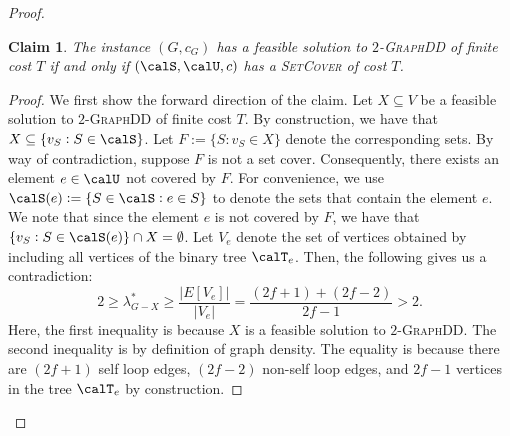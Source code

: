 \documentclass{article}
\newtheorem{claim}{Claim}[section]
\newcommand{\densitydeletionset}{\textsc{GraphDD}\xspace}
\newcommand{\setcover}{\textsc{SetCover}\xspace}
\begin{document}
\begin{proof}
    \begin{claim}\label{claim:reduction-correctness}
         The instance $(G, c_G)$ has a feasible solution to $2$-\densitydeletionset of finite cost $T$ if and only if $(\calS, \calU, c)$ has a \setcover of cost $T$.
    \end{claim}
    \begin{proof}
        We first show the forward direction of the claim. Let $X \subseteq V$ be a feasible solution to $2$-\densitydeletionset of finite cost $T$. By construction, we have that $X \subseteq \{v_S : S \in \calS\}$. Let $F := \{S : v_S \in X\}$ denote the corresponding sets. By way of contradiction, suppose $F$ is not a set cover. Consequently, there exists an element $e \in \calU$ not covered by $F$. For convenience, we use $\calS(e) := \{S\in \calS:e\in S\}$ to denote the sets that contain the element $e$. We note that since the element $e$ is not covered by $F$, we have that $\{v_S:S\in\calS(e)\}\cap X = \emptyset$. Let $V_e$ denote the set of vertices obtained by including all vertices of the binary tree $\calT_e$. Then, the following gives us a contradiction: 
        $$ 2 \geq \lambda_{G-X}^* \geq \frac{|E[V_e]|}{|V_e|} = \frac{(2f + 1) + (2f-2)}{2f - 1} > 2.$$
Here, the first inequality is because $X$ is a feasible solution to $2$-\densitydeletionset. The second inequality is by definition of graph density. The equality is because there are $(2f+1)$ self loop edges, $(2f-2)$ non-self loop edges, and $2f-1$ vertices in the tree $\calT_e$ by construction.



\end{proof}
\end{proof}
\end{document}
